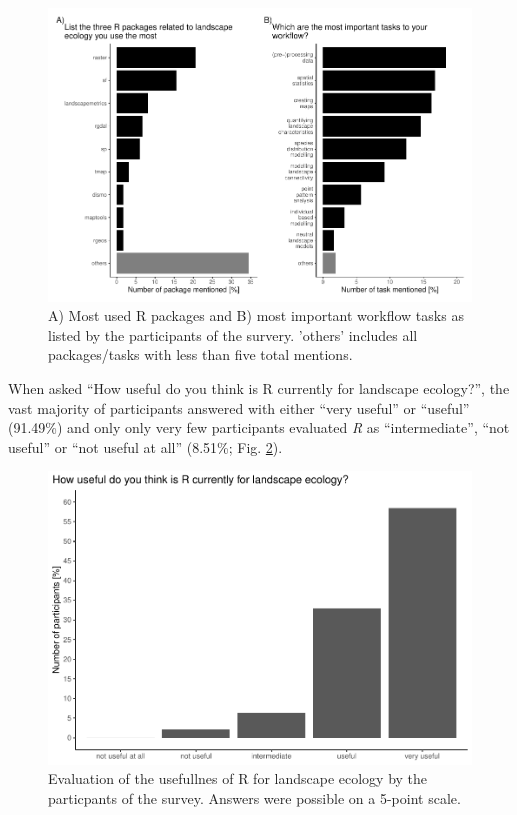 \documentclass[smallextended]{svjour3}       %
\begin{document}
\begin{figure}

{\centering \includegraphics{paper_files/figure-latex/fig-packages-tasks-1} 

}

\caption{A) Most used R packages and B) most important workflow tasks as listed by the participants of the survery. 'others' includes all packages/tasks with less than five total mentions.}\label{fig:fig-packages-tasks}
\end{figure}

When asked ``How useful do you think is R currently for landscape ecology?'', the vast majority of participants answered with either ``very useful'' or ``useful'' (91.49\%) and only only very few participants evaluated \emph{R} as ``intermediate'', ``not useful'' or ``not useful at all'' (8.51\%; Fig. \ref{fig:fig-usefulness}).

\begin{figure}

{\centering \includegraphics{paper_files/figure-latex/fig-usefulness-1} 

}

\caption{Evaluation of the usefullnes of R for landscape ecology by the particpants of the survey. Answers were possible on a 5-point scale.}\label{fig:fig-usefulness}
\end{figure}

\FloatBarrier



\end{document}
